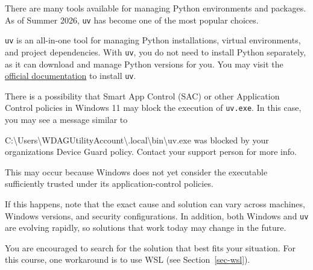 \documentclass[
  letterpaper,
  DIV=11,
  numbers=noendperiod]{scrreprt}
\newenvironment{Shaded}{\begin{snugshade}}{\end{snugshade}}
\newcommand{\NormalTok}[1]{\textcolor[rgb]{0.00,0.23,0.31}{#1}}
\theoremstyle{definition}
\theoremstyle{definition}
\theoremstyle{plain}
\theoremstyle{plain}
\theoremstyle{remark}
\begin{document}
There are many tools available for managing Python environments and
packages. As of Summer 2026, \texttt{uv} has become one of the most
popular choices.

\texttt{uv} is an all-in-one tool for managing Python installations,
virtual environments, and project dependencies. With \texttt{uv}, you do
not need to install Python separately, as it can download and manage
Python versions for you. You may visit the
\href{https://docs.astral.sh/uv/getting-started/installation/}{official
documentation} to install \texttt{uv}.

\begin{tcolorbox}[enhanced jigsaw, arc=.35mm, bottomrule=.15mm, bottomtitle=1mm, breakable, colback=white, colbacktitle=quarto-callout-caution-color!10!white, colframe=quarto-callout-caution-color-frame, coltitle=black, left=2mm, leftrule=.75mm, opacityback=0, opacitybacktitle=0.6, rightrule=.15mm, title=\textcolor{quarto-callout-caution-color}{\faFire}\hspace{0.5em}{Windows headache}, titlerule=0mm, toprule=.15mm, toptitle=1mm]

There is a possibility that Smart App Control (SAC) or other Application
Control policies in Windows 11 may block the execution of
\texttt{uv.exe}. In this case, you may see a message similar to

\begin{Shaded}
\begin{Highlighting}[]
\NormalTok{\textquotesingle{}C:\textbackslash{}Users\textbackslash{}WDAGUtilityAccount\textbackslash{}.local\textbackslash{}bin\textbackslash{}uv.exe\textquotesingle{}}
\NormalTok{was blocked by your organization\textquotesingle{}s Device Guard policy.}
\NormalTok{Contact your support person for more info.}
\end{Highlighting}
\end{Shaded}

This may occur because Windows does not yet consider the executable
sufficiently trusted under its application-control policies.

If this happens, note that the exact cause and solution can vary across
machines, Windows versions, and security configurations. In addition,
both Windows and \texttt{uv} are evolving rapidly, so solutions that
work today may change in the future.

You are encouraged to search for the solution that best fits your
situation. For this course, one workaround is to use WSL (see
Section~\ref{sec-wsl}).

\end{tcolorbox}
\end{document}

